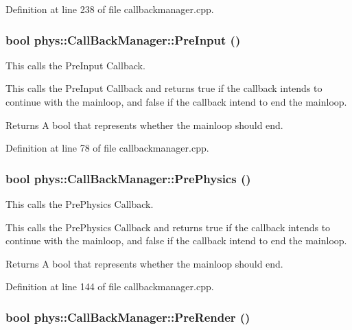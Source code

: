 Definition at line 238 of file callbackmanager.cpp.

\hypertarget{classphys_1_1CallBackManager_a84e782f8729f49b296691763351ee2b1}{
\subsubsection[{PreInput}]{\setlength{\rightskip}{0pt plus 5cm}bool phys::CallBackManager::PreInput ()}}
\label{d1/d47/classphys_1_1CallBackManager_a84e782f8729f49b296691763351ee2b1}


This calls the PreInput Callback. 

This calls the PreInput Callback and returns true if the callback intends to continue with the mainloop, and false if the callback intend to end the mainloop. \begin{DoxyReturn}{Returns}
A bool that represents whether the mainloop should end. 
\end{DoxyReturn}


Definition at line 78 of file callbackmanager.cpp.

\hypertarget{classphys_1_1CallBackManager_a65867cc4855f0f8cd84a2b4a8bbf0fd6}{
\subsubsection[{PrePhysics}]{\setlength{\rightskip}{0pt plus 5cm}bool phys::CallBackManager::PrePhysics ()}}
\label{d1/d47/classphys_1_1CallBackManager_a65867cc4855f0f8cd84a2b4a8bbf0fd6}


This calls the PrePhysics Callback. 

This calls the PrePhysics Callback and returns true if the callback intends to continue with the mainloop, and false if the callback intend to end the mainloop. \begin{DoxyReturn}{Returns}
A bool that represents whether the mainloop should end. 
\end{DoxyReturn}


Definition at line 144 of file callbackmanager.cpp.

\hypertarget{classphys_1_1CallBackManager_a244c88b8a06f68a4f4bcff6253bf6806}{
\subsubsection[{PreRender}]{\setlength{\rightskip}{0pt plus 5cm}bool phys::CallBackManager::PreRender ()}}
\label{d1/d47/classphys_1_1CallBackManager_a244c88b8a06f68a4f4bcff6253bf6806}


